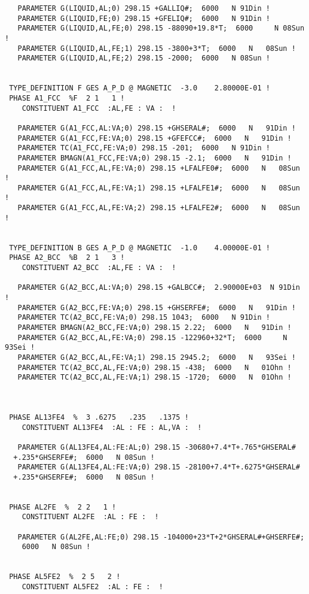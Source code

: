 \documentclass[12pt]{article}
\begin{document}
\begin{appendices}
{\begin{verbatim}
   PARAMETER G(LIQUID,AL;0) 298.15 +GALLIQ#;  6000   N 91Din !
   PARAMETER G(LIQUID,FE;0) 298.15 +GFELIQ#;  6000   N 91Din !
   PARAMETER G(LIQUID,AL,FE;0) 298.15 -88090+19.8*T;  6000     N 08Sun !
   PARAMETER G(LIQUID,AL,FE;1) 298.15 -3800+3*T;  6000   N   08Sun !
   PARAMETER G(LIQUID,AL,FE;2) 298.15 -2000;  6000   N 08Sun !


 TYPE_DEFINITION F GES A_P_D @ MAGNETIC  -3.0    2.80000E-01 !
 PHASE A1_FCC  %F  2 1   1 !
    CONSTITUENT A1_FCC  :AL,FE : VA :  !

   PARAMETER G(A1_FCC,AL:VA;0) 298.15 +GHSERAL#;  6000   N   91Din !
   PARAMETER G(A1_FCC,FE:VA;0) 298.15 +GFEFCC#;  6000   N   91Din !
   PARAMETER TC(A1_FCC,FE:VA;0) 298.15 -201;  6000   N 91Din !
   PARAMETER BMAGN(A1_FCC,FE:VA;0) 298.15 -2.1;  6000   N   91Din !
   PARAMETER G(A1_FCC,AL,FE:VA;0) 298.15 +LFALFE0#;  6000   N   08Sun !
   PARAMETER G(A1_FCC,AL,FE:VA;1) 298.15 +LFALFE1#;  6000   N   08Sun !
   PARAMETER G(A1_FCC,AL,FE:VA;2) 298.15 +LFALFE2#;  6000   N   08Sun !


 TYPE_DEFINITION B GES A_P_D @ MAGNETIC  -1.0    4.00000E-01 !
 PHASE A2_BCC  %B  2 1   3 !
    CONSTITUENT A2_BCC  :AL,FE : VA :  !

   PARAMETER G(A2_BCC,AL:VA;0) 298.15 +GALBCC#;  2.90000E+03  N 91Din !
   PARAMETER G(A2_BCC,FE:VA;0) 298.15 +GHSERFE#;  6000   N   91Din !
   PARAMETER TC(A2_BCC,FE:VA;0) 298.15 1043;  6000   N 91Din !
   PARAMETER BMAGN(A2_BCC,FE:VA;0) 298.15 2.22;  6000   N   91Din !
   PARAMETER G(A2_BCC,AL,FE:VA;0) 298.15 -122960+32*T;  6000     N 93Sei !
   PARAMETER G(A2_BCC,AL,FE:VA;1) 298.15 2945.2;  6000   N   93Sei !
   PARAMETER TC(A2_BCC,AL,FE:VA;0) 298.15 -438;  6000   N   01Ohn !
   PARAMETER TC(A2_BCC,AL,FE:VA;1) 298.15 -1720;  6000   N  01Ohn !



 PHASE AL13FE4  %  3 .6275   .235   .1375 !
    CONSTITUENT AL13FE4  :AL : FE : AL,VA :  !

   PARAMETER G(AL13FE4,AL:FE:AL;0) 298.15 -30680+7.4*T+.765*GHSERAL#
  +.235*GHSERFE#;  6000   N 08Sun !
   PARAMETER G(AL13FE4,AL:FE:VA;0) 298.15 -28100+7.4*T+.6275*GHSERAL#
  +.235*GHSERFE#;  6000   N 08Sun !


 PHASE AL2FE  %  2 2   1 !
    CONSTITUENT AL2FE  :AL : FE :  !

   PARAMETER G(AL2FE,AL:FE;0) 298.15 -104000+23*T+2*GHSERAL#+GHSERFE#;
    6000   N 08Sun !


 PHASE AL5FE2  %  2 5   2 !
    CONSTITUENT AL5FE2  :AL : FE :  !


\end{verbatim}}
\end{appendices}
\end{document}
